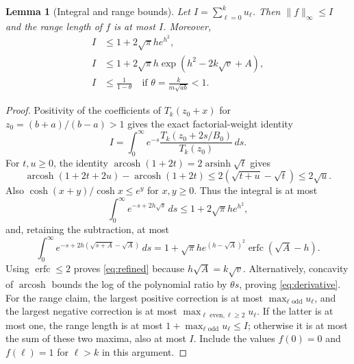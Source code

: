 \documentclass[10pt]{article}
\newtheorem{lemma}{Lemma}
\DeclareMathOperator{\arcosh}{arcosh}
\DeclareMathOperator{\arsinh}{arsinh}
\begin{document}
\begin{lemma}[Integral and range bounds]\label{lem:integral}
Let $I=\sum_{\ell=0}^k u_\ell$. Then $\|f\|_\infty\le I$ and the
range length of $f$ is at most $I$. Moreover,
\begin{align}
 I&\le1+2\sqrt\pi h e^{h^2},\label{eq:coarse}\\
 I&\le1+2\sqrt\pi h\exp(h^2-2k\sqrt v+A),\label{eq:refined}\\
 I&\le\frac1{1-\theta}\quad\text{if }\theta=\frac{k}{m\sqrt{ab}}<1.
 \label{eq:derivative}
\end{align}
\end{lemma}
\begin{proof}
Positivity of the coefficients of $T_k(z_0+x)$ for $z_0=(b+a)/(b-a)>1$
gives the exact factorial-weight identity
\[
 I=\int_0^\infty e^{-s}\frac{T_k(z_0+2s/B_0)}{T_k(z_0)}\,ds.
\]
For $t,u\ge0$, the identity $\arcosh(1+2t)=2\arsinh\sqrt t$ gives
\[
 \arcosh(1+2t+2u)-\arcosh(1+2t)
 \le2(\sqrt{t+u}-\sqrt t)\le2\sqrt u.
\]
Also $\cosh(x+y)/\cosh x\le e^y$ for $x,y\ge0$.
Thus the integral is at most
\[
 \int_0^\infty e^{-s+2h\sqrt s}\,ds
 \le1+2\sqrt\pi h e^{h^2},
\]
and, retaining the subtraction, at most
\[
 \int_0^\infty e^{-s+2h(\sqrt{s+A}-\sqrt A)}\,ds
 =1+\sqrt\pi h e^{(h-\sqrt A)^2}\operatorname{erfc}(\sqrt A-h).
\]
Using $\operatorname{erfc}\le2$ proves \eqref{eq:refined} because
$h\sqrt A=k\sqrt v$.
Alternatively, concavity of $\arcosh$ bounds the log of the polynomial
ratio by $\theta s$, proving \eqref{eq:derivative}.
For the range claim, the largest positive correction is at most
$\max_{\ell\text{ odd}}u_\ell$, and the largest negative correction
is at most $\max_{\ell\text{ even},\ell\ge2}u_\ell$.
If the latter is at most one, the range length is at most
$1+\max_{\ell\text{ odd}}u_\ell\le I$; otherwise it is at most the sum
of these two maxima, also at most $I$. Include the values $f(0)=0$ and
$f(\ell)=1$ for $\ell>k$ in this argument.
\end{proof}
\end{document}
